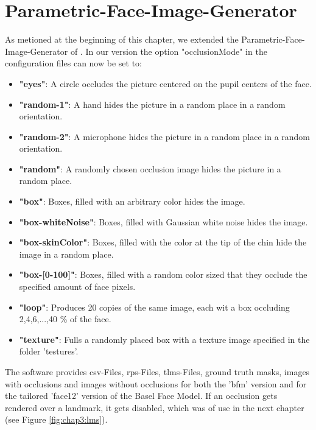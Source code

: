 \FloatBarrier

\section{Parametric-Face-Image-Generator}
As metioned at the beginning of this chapter, we extended the Parametric-Face-Image-Generator of \cite{parametric}. In our version the option "occlusionMode" in the configuration files can now be set to:
\begin{itemize}
	\item \textbf{"eyes"}: A circle occludes the picture centered on the pupil centers of the face.
	\item \textbf{"random-1"}: A  hand hides the picture in a random place in a random orientation.
	\item \textbf{"random-2"}: A  microphone hides the picture in a random place in a random orientation.
	\item \textbf{"random"}: A randomly chosen occlusion image hides the picture in a random place.
	\item \textbf{"box"}: Boxes, filled with an arbitrary color hides the image.
	\item \textbf{"box-whiteNoise"}: Boxes, filled with Gaussian white noise hides the image.
	\item \textbf{"box-skinColor"}: Boxes, filled with the color at the tip of the chin hide the image in a random place.
	\item \textbf{"box-[0-100]"}: Boxes, filled with a random color sized that they occlude the specified amount of face pixels.
	\item \textbf{"loop"}: Produces 20 copies of the same image, each wit a box occluding 2,4,6,...,40 \% of the face.
	\item \textbf{"texture"}: Fulls a randomly placed box with a texture image specified in the folder 'testures'.
\end{itemize}
The software provides csv-Files, rps-Files, tlms-Files, ground truth masks, images with occlusions and images without occlusions for both the 'bfm' version and for the tailored 'face12' version of the Basel Face Model. If an occlusion gets rendered over a landmark, it gets disabled, which was of use in the next chapter (see Figure \ref{fig:chap3:lms}).